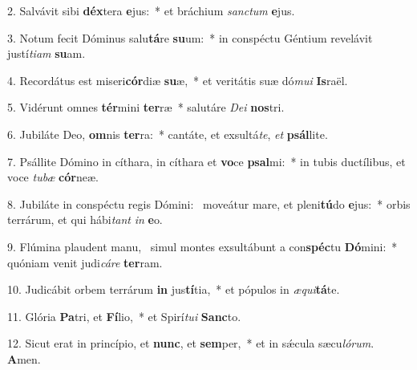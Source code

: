 2. Salvávit sibi \textbf{déx}tera \textbf{e}jus:~*  et bráchium \textit{sanc}\textit{tum} \textbf{e}jus.\

3. Notum fecit Dóminus salu\textbf{tá}re \textbf{su}um:~*  in conspéctu Géntium revelávit justí\textit{ti}\textit{am} \textbf{su}am.\

4. Recordátus est miseri\textbf{cór}diæ \textbf{su}æ,~*  et veritátis suæ dó\textit{mu}\textit{i} \textbf{Is}raël.\

5. Vidérunt omnes \textbf{tér}mini \textbf{ter}ræ~*  salutáre \textit{De}\textit{i} \textbf{nos}tri.\

6. Jubiláte Deo, \textbf{om}nis \textbf{ter}ra:~*  cantáte, et exsultá\textit{te}, \textit{et} \textbf{psál}lite.\

7. Psállite Dómino in cíthara, in cíthara et \textbf{vo}ce \textbf{psal}mi:~*  in tubis ductílibus, et voce \textit{tu}\textit{bæ} \textbf{cór}neæ.\

8. Jubiláte in conspéctu regis Dómini: \dag\  moveátur mare, et pleni\textbf{tú}do \textbf{e}jus:~*  orbis terrárum, et qui hábi\textit{tant} \textit{in} \textbf{e}o.\

9. Flúmina plaudent manu, \dag\  simul montes exsultábunt a con\textbf{spéc}tu \textbf{Dó}mini:~*  quóniam venit judi\textit{cá}\textit{re} \textbf{ter}ram.\

10. Judicábit orbem terrárum \textbf{in} jus\textbf{tí}tia,~*  et pópulos in \textit{æ}\textit{qui}\textbf{tá}te.\

11. Glória \textbf{Pa}tri, et \textbf{Fí}lio,~*  et Spirí\textit{tu}\textit{i} \textbf{Sanc}to.\

12. Sicut erat in princípio, et \textbf{nunc}, et \textbf{sem}per,~*  et in sǽcula sæcu\textit{ló}\textit{rum}. \textbf{A}men.\

